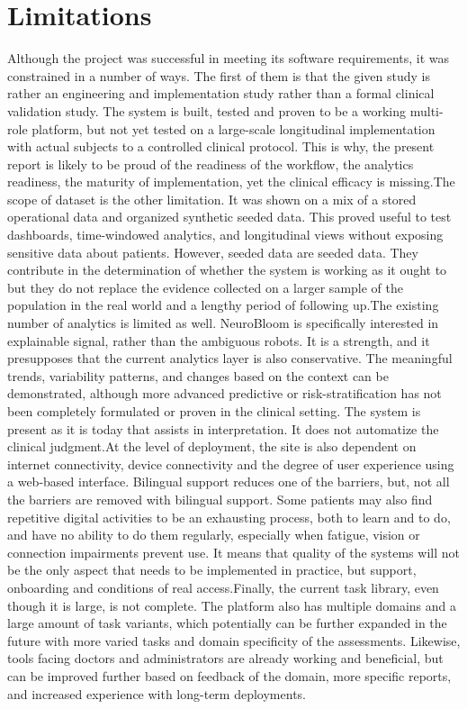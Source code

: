 \documentclass[12pt,a4paper]{report}
\begin{document}
\section{Limitations}
Although the project was successful in meeting its software requirements, it was constrained in a number of ways. The first of them is that the given study is rather an engineering and implementation study rather than a formal clinical validation study. The system is built, tested and proven to be a working multi-role platform, but not yet tested on a large-scale longitudinal implementation with actual subjects to a controlled clinical protocol. This is why, the present report is likely to be proud of the readiness of the workflow, the analytics readiness, the maturity of implementation, yet the clinical efficacy is missing.The scope of dataset is the other limitation. It was shown on a mix of a stored operational data and organized synthetic seeded data. This proved useful to test dashboards, time-windowed analytics, and longitudinal views without exposing sensitive data about patients. However, seeded data are seeded data. They contribute in the determination of whether the system is working as it ought to but they do not replace the evidence collected on a larger sample of the population in the real world and a lengthy period of following up.The existing number of analytics is limited as well. NeuroBloom is specifically interested in explainable signal, rather than the ambiguous robots. It is a strength, and it presupposes that the current analytics layer is also conservative. The meaningful trends, variability patterns, and changes based on the context can be demonstrated, although more advanced predictive or risk-stratification has not been completely formulated or proven in the clinical setting. The system is present as it is today that assists in interpretation. It does not automatize the clinical judgment.At the level of deployment, the site is also dependent on internet connectivity, device connectivity and the degree of user experience using a web-based interface. Bilingual support reduces one of the barriers, but, not all the barriers are removed with bilingual support. Some patients may also find repetitive digital activities to be an exhausting process, both to learn and to do, and have no ability to do them regularly, especially when fatigue, vision or connection impairments prevent use. It means that quality of the systems will not be the only aspect that needs to be implemented in practice, but support, onboarding and conditions of real access.Finally, the current task library, even though it is large, is not complete. The platform also has multiple domains and a large amount of task variants, which potentially can be further expanded in the future with more varied tasks and domain specificity of the assessments. Likewise, tools facing doctors and administrators are already working and beneficial, but can be improved further based on feedback of the domain, more specific reports, and increased experience with long-term deployments.
\end{document}
